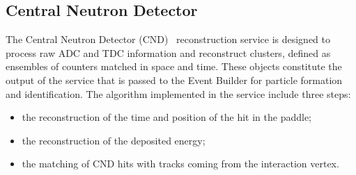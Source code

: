 \subsection{Central Neutron Detector}

The Central Neutron Detector (CND)~\cite{cnd-nim} reconstruction service is designed to process raw ADC and TDC information and reconstruct clusters, defined as ensembles of counters matched in space and time. These objects constitute the output of the service that is passed to the Event Builder for particle formation and identification. The algorithm implemented in the service include three steps:

\begin{itemize}
\item{the reconstruction of the time and position of the hit in the paddle;}
\item{the reconstruction of the deposited energy;}
\item{the matching of CND hits with tracks coming from the interaction vertex.}
\end{itemize}

%


